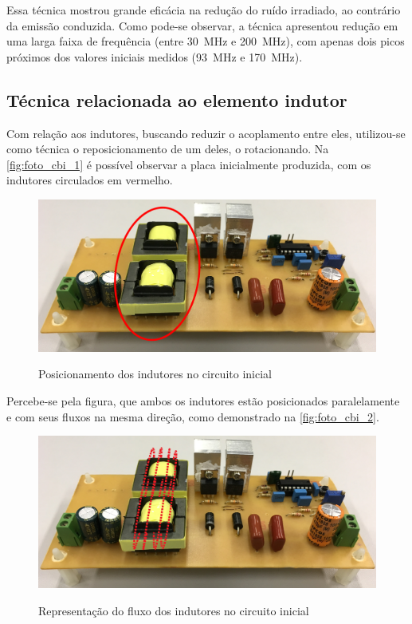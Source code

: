     Essa técnica mostrou grande eficácia na redução do ruído irradiado, ao contrário da emissão conduzida. Como pode-se observar, a técnica apresentou redução em uma larga faixa de frequência (entre \qty{30}{\mega\hertz} e \qty{200}{\mega\hertz}), com apenas dois picos próximos dos valores iniciais medidos (\qty{93}{\mega\hertz} e \qty{170}{\mega\hertz}).
    
    \subsection{Técnica relacionada ao elemento indutor} \label{cap:result_tecnicas_indut}
    
    Com relação aos indutores, buscando reduzir o acoplamento entre eles, utilizou-se como técnica o reposicionamento de um deles, o rotacionando. Na \autoref{fig:foto_cbi_1} é possível observar a placa inicialmente produzida, com os indutores circulados em vermelho. 
    
    \begin{figure}[H]
    	\centering
    	\caption{Posicionamento dos indutores no circuito inicial}
    	\includegraphics[scale=.1]{pdf/fotos/placa_vista_lateral_sel.jpg}
        \label{fig:foto_cbi_1}
    \end{figure}
    
    Percebe-se pela figura, que ambos os indutores estão posicionados paralelamente e com seus fluxos na mesma direção, como demonstrado na \autoref{fig:foto_cbi_2}.
    
    \begin{figure}[H]
    	\centering
    	\caption{Representação do fluxo dos indutores no circuito inicial}
    	\includegraphics[scale=.1]{pdf/fotos/placa_vista_lateral_fluxo.jpg}
        \label{fig:foto_cbi_2}
    \end{figure}
    
